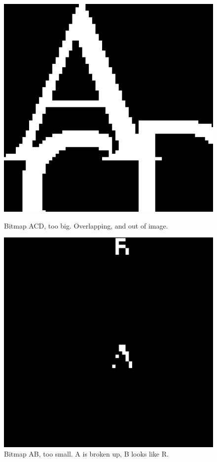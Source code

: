 \begin{figure}[!htb]
      \includegraphics[width=\linewidth]{figures/Bitmap-big-ACD}
      \caption{Bitmap ACD, too big. Overlapping, and out of image.}
      \label{Bitmap-big-ACD}
    \endminipage\hfill
      \includegraphics[width=\linewidth]{figures/Bitmap-small-AB}
      \caption{Bitmap AB, too small. A is broken up, B looks like R.} 
      \label{Bitmap-small-AB}
    \endminipage
\end{figure}

